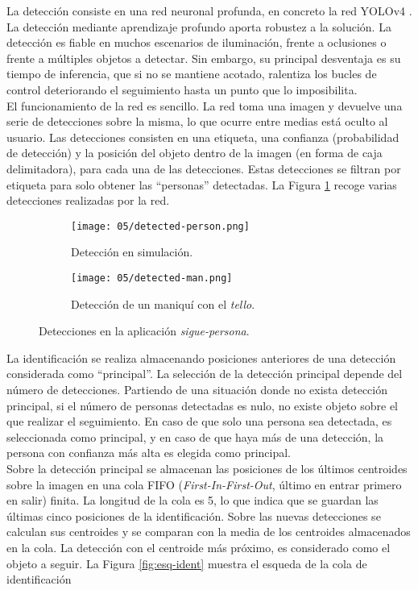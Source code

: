 \documentclass[../main.tex]{subfiles}
\begin{document}
La detección consiste en una red neuronal profunda, en concreto la red YOLOv4 \cite{bochkovskiy2020yolov4}. La detección mediante aprendizaje profundo aporta robustez a la solución. La detección es fiable en muchos escenarios de iluminación, frente a oclusiones o frente a múltiples objetos a detectar. Sin embargo, su principal desventaja es su tiempo de inferencia, que si no se mantiene acotado, ralentiza los bucles de control deteriorando el seguimiento hasta un punto que lo imposibilita. \\
El funcionamiento de la red es sencillo. La red toma una imagen y devuelve una serie de detecciones sobre la misma, lo que ocurre entre medias está oculto al usuario. Las detecciones consisten en una etiqueta, una confianza (probabilidad de detección) y la posición del objeto dentro de la imagen (en forma de caja delimitadora), para cada una de las detecciones. Estas detecciones se filtran por etiqueta para solo obtener las ``personas'' detectadas. La Figura \ref{fig:fp-det} recoge varias detecciones realizadas por la red.

\begin{figure}[ht]
 	\centering
    \begin{subfigure}[b]{0.8\textwidth}
        \texttt{[image: 05/detected-person.png]}
        \caption{Detección en simulación.}
    \end{subfigure}
        
    \begin{subfigure}[b]{0.7\textwidth}
        \texttt{[image: 05/detected-man.png]}
        \caption{Detección de un maniquí con el \emph{tello}.}
    \end{subfigure}
    
    \caption{Detecciones en la aplicación \emph{sigue-persona}.}
    \label{fig:fp-det}
\end{figure}

La identificación se realiza almacenando posiciones anteriores de una detección considerada como ``principal''. La selección de la detección principal depende del número de detecciones. Partiendo de una situación donde no exista detección principal, si el número de personas detectadas es nulo, no existe objeto sobre el que realizar el seguimiento. En caso de que solo una persona sea detectada, es seleccionada como principal, y en caso de que haya más de una detección, la persona con confianza más alta es elegida como principal. \\
Sobre la detección principal se almacenan las posiciones de los últimos centroides sobre la imagen en una cola FIFO (\emph{First-In-First-Out}, último en entrar primero en salir) finita. La longitud de la cola es 5, lo que indica que se guardan las últimas cinco posiciones de la identificación. Sobre las nuevas detecciones se calculan sus centroides y se comparan con la media de los centroides almacenados en la cola. La detección con el centroide más próximo, es considerado como el objeto a seguir. La Figura \ref{fig:esq-ident} muestra el esqueda de la cola de identificación
\end{document}
